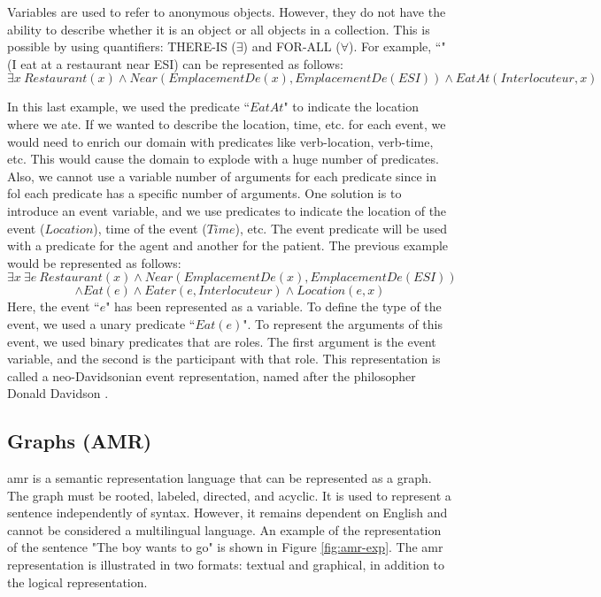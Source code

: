 \documentclass{KBook}
\begin{document}
Variables are used to refer to anonymous objects.  
However, they do not have the ability to describe whether it is an object or all objects in a collection. 
This is possible by using quantifiers: THERE-IS ($\exists$) and FOR-ALL ($\forall$).
For example, ``" (I eat at a restaurant near ESI) can be represented as follows: 
\[\exists x\ Restaurant(x) \wedge Near(EmplacementDe(x), EmplacementDe(ESI)) \wedge  EatAt(Interlocuteur, x)\]


In this last example, we used the predicate ``$EatAt$" to indicate the location where we ate. 
If we wanted to describe the location, time, etc. for each event, we would need to enrich our domain with predicates like verb-location, verb-time, etc. 
This would cause the domain to explode with a huge number of predicates. 
Also, we cannot use a variable number of arguments for each predicate since in \ac{fol} each predicate has a specific number of arguments. 
One solution is to introduce an event variable, and we use predicates to indicate the location of the event ($Location$), time of the event ($Time$), etc.
The event predicate will be used with a predicate for the agent and another for the patient.
The previous example would be represented as follows: 
\[\exists x\ \exists e\ Restaurant(x) \wedge Near(EmplacementDe(x), EmplacementDe(ESI))\]
\[\wedge Eat(e) \wedge  Eater(e, Interlocuteur) \wedge Location(e, x)\]
Here, the event ``$e$" has been represented as a variable. 
To define the type of the event, we used a unary predicate ``$Eat(e)$". 
To represent the arguments of this event, we used binary predicates that are roles.
The first argument is the event variable, and the second is the participant with that role.
This representation is called a neo-Davidsonian event representation, named after the philosopher Donald Davidson \cite{1967-davidson}.




\subsection{Graphs (AMR)}

\ac{amr} is a semantic representation language \cite{2013-banarescu-al} that can be represented as a graph. 
The graph must be rooted, labeled, directed, and acyclic. 
It is used to represent a sentence independently of syntax.
However, it remains dependent on English and cannot be considered a multilingual language.
An example of the representation of the sentence "The boy wants to go" is shown in Figure \ref{fig:amr-exp}.
The \ac{amr} representation is illustrated in two formats: textual and graphical, in addition to the logical representation.
\end{document}
